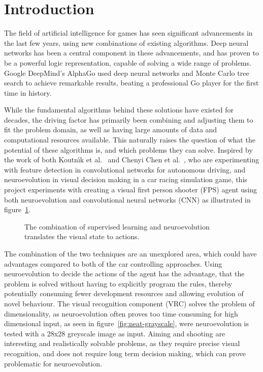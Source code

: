 
\section{Introduction}
The field of artificial intelligence for games has seen significant advancements in the last few years, using new combinations of existing algorithms. Deep neural networks has been a central component in these advancements, and has proven to be a powerful logic representation, capable of solving a wide range of problems. Google DeepMind's AlphaGo\cite{christian} used deep neural networks and Monte Carlo tree search to achieve remarkable results, beating a professional Go player for the first time in history.

While the fundamental algorithms behind these solutions have existed for decades, the driving factor has primarily been combining and adjusting them to fit the problem domain, as well as having large amounts of data and computational resources available. This naturally raises the question of what the potential of these algorithms is, and which problems they can solve. Inspired by the work of both Koutn\'{\i}k et al.~\cite{torcs} and Chenyi Chen et al.~\cite{chen}, who are experimenting with feature detection in convolutional networks for autonomous driving, and neuroevolution in visual decision making in a car racing simulation game, this project experiments with creating a visual first person shooter (FPS) agent using both neuroevolution and convolutional neural networks (CNN) as illustrated in figure~\ref{fig:architecture}.

\begin{figure}[h]
	\begin{scriptsize}
		\sffamily
		\def\svgwidth{\textwidth}
		
		\vspace{-45mm}
	\end{scriptsize}
	\caption[Overview of the architecture of the solution]{The combination of supervised learning and neuroevolution translates the visual state to actions.}
	\label{fig:architecture}
\end{figure}

The combination of the two techniques are an unexplored area, which could have advantages compared to both of the car controlling approaches. Using neuroevolution to decide the actions of the agent has the advantage, that the problem is solved without having to explicitly program the rules, thereby potentially consuming fewer development resources and allowing evolution of novel behaviour. The visual recognition component (VRC) solves the problem of dimensionality, as neuroevolution often proves too time consuming for high dimensional input, as seen in figure~\ref{fig:neat-grayscale}, were neuroevolution is tested with a 28x28 greyscale image as input. Aiming and shooting are interesting and realistically solvable problems, as they require precise visual recognition, and does not require long term decision making, which can prove problematic for neuroevolution.

